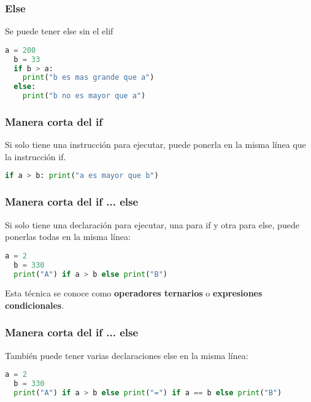 \begin{frame}[fragile]
  \frametitle{Else}

  Se puede tener \textcolor{codeKeyword}{else} sin el
  \textcolor{codeKeyword}{elif}

  \vspace{\baselineskip}
  \begin{lstlisting}[language=Python]
  a = 200
  b = 33
  if b > a:
    print("b es mas grande que a")
  else:
    print("b no es mayor que a")
  \end{lstlisting}
\end{frame}

\begin{frame}[fragile]
  \frametitle{Manera corta del if}

  Si solo tiene una instrucción para ejecutar, puede ponerla en la misma
  línea que la instrucción if.

  \vspace{\baselineskip}
  \begin{lstlisting}[language=Python]
  if a > b: print("a es mayor que b")
  \end{lstlisting}
\end{frame}

\begin{frame}[fragile]
  \frametitle{Manera corta del if ... else}

  Si solo tiene una declaración para ejecutar, una para if y otra para
  else, puede ponerlas todas en la misma línea:

  \vspace{\baselineskip}
  \begin{lstlisting}[language=Python]
  a = 2
  b = 330
  print("A") if a > b else print("B")
  \end{lstlisting}

  \vspace{\baselineskip}
  \begin{exampleblock}{}
    Esta técnica se conoce como \textbf{operadores ternarios} o
    \textbf{expresiones condicionales}.
  \end{exampleblock}
\end{frame}

\begin{frame}[fragile]
  \frametitle{Manera corta del if ... else}

  También puede tener varias declaraciones else en la misma línea:

  \vspace{\baselineskip}
  \begin{lstlisting}[language=Python]
  a = 2
  b = 330
  print("A") if a > b else print("=") if a == b else print("B")
  \end{lstlisting}
\end{frame}

